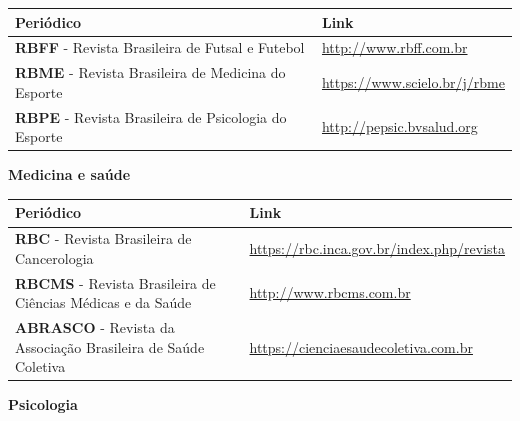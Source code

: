 \documentclass[
]{book}
\newcounter{none} %
\begin{document}
{\def\LTcaptype{none} %
\begin{longtable}[]{@{}
  >{\raggedright\arraybackslash}p{}
  >{\raggedright\arraybackslash}p{}@{}}
\toprule\noalign{}
\begin{minipage}[b]{\linewidth}\raggedright
Periódico
\end{minipage} & \begin{minipage}[b]{\linewidth}\raggedright
Link
\end{minipage} \\
\midrule\noalign{}
\endhead
\bottomrule\noalign{}
\endlastfoot
\textbf{RBFF} - Revista Brasileira de Futsal e Futebol & \url{http://www.rbff.com.br} \\
\textbf{RBME} - Revista Brasileira de Medicina do Esporte & \url{https://www.scielo.br/j/rbme} \\
\textbf{RBPE} - Revista Brasileira de Psicologia do Esporte & \url{http://pepsic.bvsalud.org} \\
\end{longtable}
}

\textbf{Medicina e saúde}

{\def\LTcaptype{none} %
\begin{longtable}[]{@{}
  >{\raggedright\arraybackslash}p{}
  >{\raggedright\arraybackslash}p{}@{}}
\toprule\noalign{}
\begin{minipage}[b]{\linewidth}\raggedright
Periódico
\end{minipage} & \begin{minipage}[b]{\linewidth}\raggedright
Link
\end{minipage} \\
\midrule\noalign{}
\endhead
\bottomrule\noalign{}
\endlastfoot
\textbf{RBC} - Revista Brasileira de Cancerologia & \url{https://rbc.inca.gov.br/index.php/revista} \\
\textbf{RBCMS} - Revista Brasileira de Ciências Médicas e da Saúde & \url{http://www.rbcms.com.br} \\
\textbf{ABRASCO} - Revista da Associação Brasileira de Saúde Coletiva & \url{https://cienciaesaudecoletiva.com.br} \\
\end{longtable}
}

\textbf{Psicologia}
\end{document}
